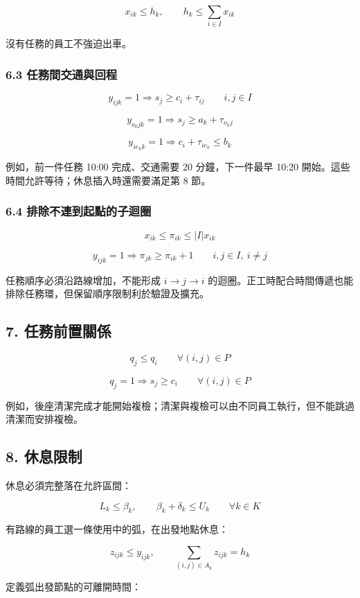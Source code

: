 \documentclass[UTF8,fontset=fandol]{ctexart}
\begin{document}
\[
x_{ik}\le h_k,\qquad
h_k\le\sum_{i\in I}x_{ik}
\]

沒有任務的員工不強迫出車。

\subsubsection*{6.3 任務間交通與回程}

\[
y_{ijk}=1\Rightarrow s_j\ge c_i+\tau_{ij}
\qquad i,j\in I
\]

\[
y_{o_kjk}=1\Rightarrow s_j\ge a_k+\tau_{o_kj}
\]

\[
y_{ie_kk}=1\Rightarrow c_i+\tau_{ie_k}\le b_k
\]

例如，前一件任務 10:00 完成、交通需要 20 分鐘，下一件最早 10:20 開始。這些時間允許等待；休息插入時還需要滿足第 8 節。

\subsubsection*{6.4 排除不連到起點的子迴圈}

\[
x_{ik}\le\pi_{ik}\le |I|x_{ik}
\]

\[
y_{ijk}=1\Rightarrow\pi_{jk}\ge\pi_{ik}+1
\qquad i,j\in I,\ i\ne j
\]

任務順序必須沿路線增加，不能形成 $i\to j\to i$ 的迴圈。正工時配合時間傳遞也能排除任務環，但保留順序限制利於驗證及擴充。

\subsection*{7. 任務前置關係}

\[
q_j\le q_i
\qquad\forall(i,j)\in P
\]

\[
q_j=1\Rightarrow s_j\ge c_i
\qquad\forall(i,j)\in P
\]

例如，後座清潔完成才能開始複檢；清潔與複檢可以由不同員工執行，但不能跳過清潔而安排複檢。

\subsection*{8. 休息限制}

休息必須完整落在允許區間：

\[
L_k\le\beta_k,\qquad
\beta_k+\delta_k\le U_k
\qquad\forall k\in K
\]

有路線的員工選一條使用中的弧，在出發地點休息：

\[
z_{ijk}\le y_{ijk},\qquad
\sum_{(i,j)\in A_k}z_{ijk}=h_k
\]

定義弧出發節點的可離開時間：
\end{document}
